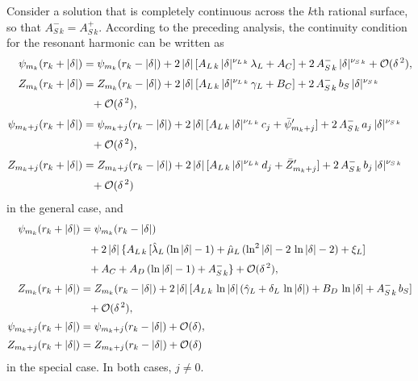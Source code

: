 \documentclass[12pt,prb,aps]{revtex4-1}
\begin{document}
Consider a solution that is completely continuous across the $k$th rational surface, so that $A_{S\,k}^-=A_{S\,k}^+$. According to the
preceding analysis, the continuity condition for the resonant harmonic can be written as
\begin{align}
\psi_{m_k}(r_k+|\delta|) &= \psi_{m_k}(r_k-|\delta|) + 2\,|\delta|\,[A_{L\,k}\,|\delta|^{\nu_{L\,k}}\,\lambda_L + A_C] + 2\,A_{S\,k}^-\,|\delta|^{\nu_{S\,k}}+ {\cal O}(\delta^{\,2}),\\[0.5ex]
Z_{m_k} (r_k+|\delta|) &=  Z_{m_k}(r_k-|\delta|) + 2\,|\delta|\,[A_{L\,k}\,|\delta|^{\nu_{L\,k}}\,\gamma_L + B_C] + 2\,A_{S\,k}^-\,b_S\,|\delta|^{\nu_{S\,k}} 
\nonumber\\[0.5ex]&\phantom{=}+ {\cal O}(\delta^{\,2}),\\[0.5ex]
\psi_{m_k+j}(r_k+|\delta|) &= \psi_{m_k+j}(r_k-|\delta|) +2\,|\delta|\,[A_{L\,k}\,|\delta|^{\nu_{L\,k}}\,c_j + \bar{\psi}_{m_k+j}'] + 2\,A_{S\,k}^-\,a_j\,|\delta|^{\nu_{S\,k}}\nonumber\\[0.5ex]&\phantom{=} +{\cal O}(\delta^{\,2}),\\[0.5ex]
Z_{m_k+j}(r_k+|\delta|) &= Z_{m_k+j}(r_k-|\delta|) +2\,|\delta|\,[A_{L\,k}\,|\delta|^{\nu_{L\,k}}\,d_j + \bar{Z}_{m_k+j}'] + 2\,A_{S\,k}^-\,b_j\,|\delta|^{\nu_{S\,k}}
\nonumber\\[0.5ex]&\phantom{=}+ {\cal O}(\delta^{\,2})
\end{align}
in the general case, and 
\begin{align}
\psi_{m_k}(r_k+|\delta|) &= \psi_{m_k}(r_k-|\delta|) \nonumber\\[0.5ex]
&\phantom{=}+ 2\,|\delta|\,\{A_{L\,k}\,[\hat{\lambda}_L\,(\ln|\delta|-1)+\hat{\mu}_L\,(\ln^2|\delta|-2\,\ln|\delta|-2)+ \xi_L]\nonumber\\[0.5ex]
&\phantom{=}+ A_C
+A_D\,(\ln|\delta|-1) + A_{S\,k}^-\}+ {\cal O}(\delta^{\,2}),\\[0.5ex]
Z_{m_k} (r_k+|\delta|) &=  Z_{m_k}(r_k-|\delta|) + 2\,|\delta|\,[A_{L\,k}\,\ln|\delta| \,(\hat{\gamma}_L+\delta_L\,\ln|\delta|)+ B_D\,\ln|\delta|
+A_{S\,k}^-\,b_{S}]\nonumber\\[0.5ex]&\phantom{=}+ {\cal O}(\delta^{\,2}),\\[0.5ex]
\psi_{m_k+j}(r_k+|\delta|) &= \psi_{m_k+j}(r_k-|\delta|)+{\cal O}(\delta),\\[0.5ex]
Z_{m_k+j}(r_k+|\delta|) &= Z_{m_k+j}(r_k-|\delta|)+{\cal O}(\delta)
\end{align}
in the special case. In both cases, $j\neq 0$.
\end{document}
